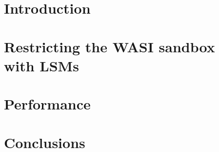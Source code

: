 \documentclass[a4paper,12pt,twoside,openright]{report}
\begin{document}
  
  \emptypage
  
  \emptypage
  \toc
  \emptypage

  \clearpage
  
  \chapter{Introduction}
  

  \chapter{Restricting the WASI sandbox with LSMs}
  

  \chapter{Performance}
  

  \chapter{Conclusions}
  

  \nocite{*}
  \printbibliography[heading=bibintoc]
\end{document}

